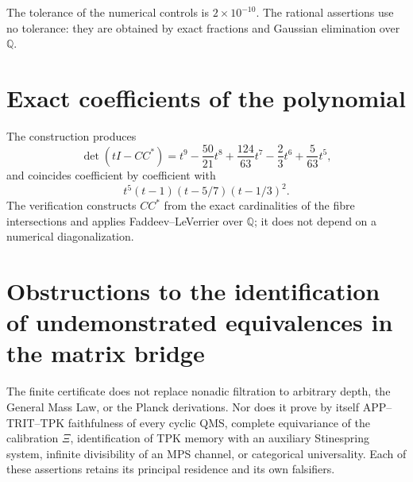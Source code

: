 The tolerance of the numerical controls is \(2\times10^{-10}\). The
rational assertions use no tolerance: they are obtained by exact fractions
and Gaussian elimination over \(\mathbb Q\).

\section{Exact coefficients of the polynomial}

The construction produces
\[
 \det(tI-CC^*)
 =t^9-\frac{50}{21}t^8+\frac{124}{63}t^7
  -\frac23t^6+\frac5{63}t^5,
 \tag{GMC-A.1}
\]
and coincides coefficient by coefficient with
\[
 t^5(t-1)(t-5/7)(t-1/3)^2.
 \tag{GMC-A.2}
\]
The verification constructs \(CC^*\) from the exact cardinalities of the
fibre intersections and applies Faddeev--LeVerrier over \(\mathbb Q\); it does not
depend on a numerical diagonalization.

\section{Obstructions to the identification of undemonstrated equivalences in the matrix bridge}

The finite certificate does not replace nonadic filtration to arbitrary depth, the
General Mass Law, or the Planck derivations. Nor does it prove by
itself APP--TRIT--TPK faithfulness of every cyclic QMS, complete equivariance
of the calibration \(\Xi\), identification of TPK memory with an
auxiliary Stinespring system, infinite divisibility of an MPS channel, or
categorical universality. Each of these assertions retains its principal
residence and its own falsifiers.
